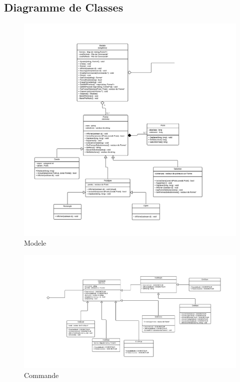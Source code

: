 \documentclass[12pt]{article}
\begin{document}
\subsection{Diagramme de Classes}
\begin{figure}[ht]
\begin{center}
\includegraphics*[scale = 0.5]{Tp4-Modele.png}
\end{center}
\caption{Modele}
\label{Coeur de l'application}
\end{figure}

\begin{figure}[Ht]
\begin{center}
\includegraphics[scale = 0.44]{Tp4-Commande.png}
\end{center}
\caption{Commande}
\label{Commande}
\end{figure}
~
\newline
\end{document}

